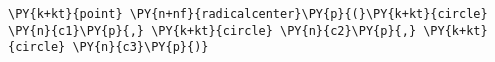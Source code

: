 \begin{Verbatim}[commandchars=\\\{\}]
    \PY{k+kt}{point} \PY{n+nf}{radicalcenter}\PY{p}{(}\PY{k+kt}{circle} \PY{n}{c1}\PY{p}{,} \PY{k+kt}{circle} \PY{n}{c2}\PY{p}{,} \PY{k+kt}{circle} \PY{n}{c3}\PY{p}{)}
\end{Verbatim}
